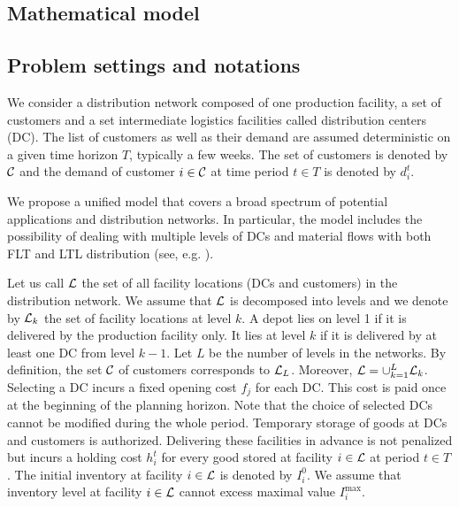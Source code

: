 \documentclass[a4paper,10pt]{article}
\begin{document}
\begin{linenumbers}
\newpage

\section{Mathematical model}

\label{sec:model}

\subsection{Problem settings and notations}\label{subsection:settings}


We consider a  distribution network composed of one production facility, 
a set of customers and a set intermediate logistics facilities called distribution centers (DC). 
The list of customers as well as their demand are assumed deterministic on a given time horizon $T$, typically a few weeks. 
The set of customers is denoted by $\mathcal{C}$ and the demand of customer $i \in \mathcal{C}$ at time period $t\in T$ is denoted by $d^t_i$.

We propose a unified model that covers a broad spectrum of potential applications and distribution networks. 
In particular, the model includes the possibility of dealing with multiple levels of DCs and material flows with both FLT and LTL distribution (see, e.g. \cite{AmbScu05}). 

Let us call $\mathcal{L}$ the set of all facility locations (DCs and customers) in the distribution network. 
We assume that $\mathcal{L}$ is decomposed into levels and we denote by $\mathcal{L}_k$ the set of facility locations at level $k$. 
A depot lies on level 1 if it is delivered by the production facility only. 
It lies at level $k$ if it is delivered by at least one DC from level $k-1$. 
Let $L$ be the number of levels in the networks. By definition, the set $\mathcal{C}$ of customers corresponds to $\mathcal{L}_L$.
Moreover, $\mathcal{L}=\cup_{k=1}^L \mathcal{L}_k$.
%
Selecting a DC incurs a fixed opening cost $f_j$ for each DC. 
This cost is paid once at the beginning of the planning horizon. 
Note that the choice of selected DCs cannot be modified during the whole period. 
%
Temporary storage of goods at DCs and customers is authorized. 
Delivering these facilities in advance is not penalized but incurs a holding cost $h^t_i$ for every good stored at facility $i \in \mathcal{L}$ at period $t \in T$.
The initial inventory at facility $i \in \mathcal{L}$ is denoted by $I_i^0$. 
We assume that inventory level at facility $i \in \mathcal{L}$ cannot excess maximal value $I_i^{\max}$. 


\end{linenumbers}
\end{document}
